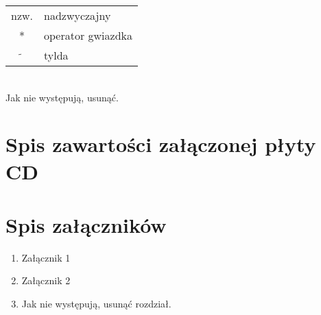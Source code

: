 \documentclass[a4paper,11pt,twoside]{report}
\theoremstyle{definition}
\begin{document}
\begin{tabular}{cl}
nzw. & nadzwyczajny \\
* & operator gwiazdka \\
$\widetilde{}$ & tylda
\end{tabular}
\\
Jak nie występują, usunąć.








\chapter*{Spis zawartości załączonej płyty CD}



\chapter*{Spis załączników}
\begin{enumerate}
\item Załącznik 1
\item Załącznik 2
\item Jak nie występują, usunąć rozdział.
\end{enumerate}
\end{document}

